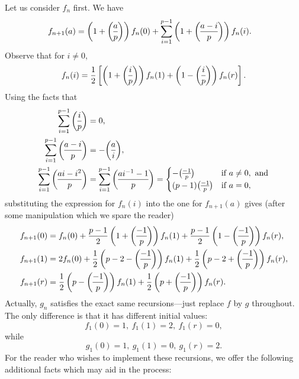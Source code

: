 Let us consider $f_n$ first. We have
\begin{align*}
	f_{n+1}(a) &= \left(1 + \legendre{a}{p}\right) f_n(0) + \sum_{i =1}^{p-1} \left(1 + \legendre{a-i}{p}\right)f_n(i) .
\end{align*}
Observe that for $i \neq 0$,
\[
	f_n(i) = \frac{1}{2}\left[\left(1 + \legendre{i}{p}\right)f_n(1) + \left(1 - \legendre{i}{p}\right) f_n(r)\right].
\]
Using the facts that
\begin{align*}
	\sum_{i=1}^{p-1} \legendre{i}{p} &= 0,\\
	\sum_{i=1}^{p-1} \legendre{a-i}{p} &= -\legendre{a}{i},\\
	\sum_{i=1}^{p-1} \legendre{ai -i^2}{p} &= \sum_{i=1}^{p-1} \legendre{ai^{-1} - 1}{p} = \begin{cases}
		-\legendre{-1}{p} & \text{if }a\neq 0, \text{ and}\\
		(p-1)\legendre{-1}{p} & \text{if }a=0,
	\end{cases}
\end{align*}
substituting the expression for $f_n(i)$ into the one for $f_{n+1}(a)$ gives (after some manipulation which we spare the reader)
\begin{align*}
	f_{n+1}(0) &= f_n(0) + \frac{p-1}{2}\left(1+\legendre{-1}{p}\right) f_n(1) + \frac{p-1}{2}\left(1-\legendre{-1}{p}\right) f_n(r),\\
	f_{n+1}(1) &= 2f_n(0) + \frac{1}{2}\left(p-2-\legendre{-1}{p}\right) f_n(1) + \frac{1}{2}\left(p-2+\legendre{-1}{p}\right) f_n(r),\\
	f_{n+1}(r) &= \frac{1}{2}\left(p-\legendre{-1}{p}\right) f_n(1) + \frac{1}{2}\left(p+\legendre{-1}{p}\right) f_n(r).
\end{align*}
Actually, $g_n$ satisfies the exact same recursions---just replace $f$ by $g$ throughout. The only difference is that it has different initial values:
\[
	f_1(0) = 1 ,\: f_1(1) = 2 ,\: f_1(r) = 0,
\]
while
\[
	g_1(0) = 1 ,\: g_1(1) = 0 ,\: g_1(r) = 2.
\]
For the reader who wishes to implement these recursions, we offer the following additional facts which may aid in the process:
